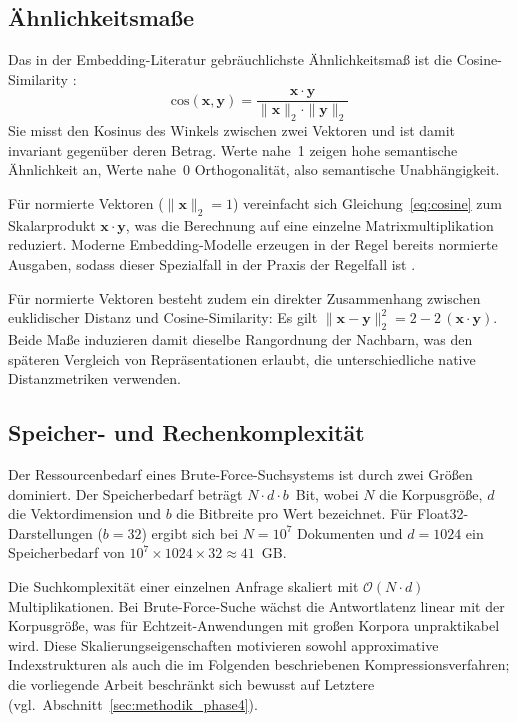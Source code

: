 \subsection{Ähnlichkeitsmaße}
%
Das in der Embedding-Literatur gebräuchlichste Ähnlichkeitsmaß ist die Cosine-Similarity \cite{manning_2008_ir,reimers_2019_sbert}:
\begin{equation}
\label{eq:cosine}
  \text{cos}(\mathbf{x}, \mathbf{y}) = \frac{\mathbf{x} \cdot \mathbf{y}}{\|\mathbf{x}\|_2 \cdot \|\mathbf{y}\|_2}
\end{equation}
%
Sie misst den Kosinus des Winkels zwischen zwei Vektoren und ist damit invariant gegenüber deren Betrag.
Werte nahe~1 zeigen hohe semantische Ähnlichkeit an, Werte nahe~0 Orthogonalität, also semantische Unabhängigkeit.
\par
Für normierte Vektoren ($\|\mathbf{x}\|_2 = 1$) vereinfacht sich Gleichung~\ref{eq:cosine} zum Skalarprodukt $\mathbf{x} \cdot \mathbf{y}$, was die Berechnung auf eine einzelne Matrixmultiplikation reduziert.
Moderne Embedding-Modelle erzeugen in der Regel bereits normierte Ausgaben, sodass dieser Spezialfall in der Praxis der Regelfall ist \cite{reimers_2019_sbert,xiao_2023_bge}.
\par
Für normierte Vektoren besteht zudem ein direkter Zusammenhang zwischen euklidischer Distanz und Cosine-Similarity: Es gilt $\|\mathbf{x} - \mathbf{y}\|_2^2 = 2 - 2\,(\mathbf{x} \cdot \mathbf{y})$.
Beide Maße induzieren damit dieselbe Rangordnung der Nachbarn, was den späteren Vergleich von Repräsentationen erlaubt, die unterschiedliche native Distanzmetriken verwenden.
%
\subsection{Speicher- und Rechenkomplexität}
%
Der Ressourcenbedarf eines Brute-Force-Suchsystems ist durch zwei Größen dominiert.
Der Speicherbedarf beträgt $N \cdot d \cdot b$~Bit, wobei $N$ die Korpusgröße, $d$ die Vektordimension und $b$ die Bitbreite pro Wert bezeichnet.
Für Float32-Darstellungen ($b = 32$) ergibt sich bei $N = 10^7$ Dokumenten und $d = 1024$ ein Speicherbedarf von $10^7 \times 1024 \times 32 \approx 41$~GB.
\par
Die Suchkomplexität einer einzelnen Anfrage skaliert mit $\mathcal{O}(N \cdot d)$ Multiplikationen.
Bei Brute-Force-Suche wächst die Antwortlatenz linear mit der Korpusgröße, was für Echtzeit-Anwendungen mit großen Korpora unpraktikabel wird.
Diese Skalierungseigenschaften motivieren sowohl approximative Indexstrukturen \cite{malkov_2020_hnsw,johnson_2021_faiss} als auch die im Folgenden beschriebenen Kompressionsverfahren; die vorliegende Arbeit beschränkt sich bewusst auf Letztere (vgl.\ Abschnitt~\ref{sec:methodik_phase4}).
%
%
